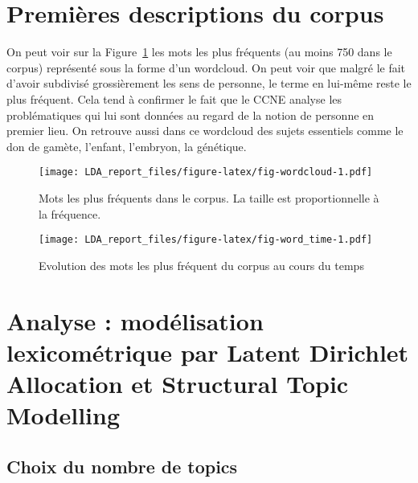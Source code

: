 \documentclass[
  letterpaper,
  DIV=11,
  numbers=noendperiod]{scrartcl}
\begin{document}
\hypertarget{premiuxe8res-descriptions-du-corpus}{%
\section{Premières descriptions du
corpus}\label{premiuxe8res-descriptions-du-corpus}}

On peut voir sur la Figure~\ref{fig-wordcloud} les mots les plus
fréquents (au moins 750 dans le corpus) représenté sous la forme d'un
wordcloud. On peut voir que malgré le fait d'avoir subdivisé
grossièrement les sens de personne, le terme en lui-même reste le plus
fréquent. Cela tend à confirmer le fait que le CCNE analyse les
problématiques qui lui sont données au regard de la notion de personne
en premier lieu. On retrouve aussi dans ce wordcloud des sujets
essentiels comme le don de gamète, l'enfant, l'embryon, la génétique.

\begin{figure}

{\centering \texttt{[image: LDA\_report\_files/figure-latex/fig-wordcloud-1.pdf]}

}

\caption{\label{fig-wordcloud}Mots les plus fréquents dans le corpus. La
taille est proportionnelle à la fréquence.}

\end{figure}

\begin{figure}

{\centering \texttt{[image: LDA\_report\_files/figure-latex/fig-word\_time-1.pdf]}

}

\caption{\label{fig-word_time}Evolution des mots les plus fréquent du
corpus au cours du temps}

\end{figure}

\hypertarget{analyse-moduxe9lisation-lexicomuxe9trique-par-latent-dirichlet-allocation-et-structural-topic-modelling}{%
\section{Analyse : modélisation lexicométrique par Latent Dirichlet
Allocation et Structural Topic
Modelling}\label{analyse-moduxe9lisation-lexicomuxe9trique-par-latent-dirichlet-allocation-et-structural-topic-modelling}}

\hypertarget{choix-du-nombre-de-topics}{%
\subsection{Choix du nombre de topics}\label{choix-du-nombre-de-topics}}
\end{document}
